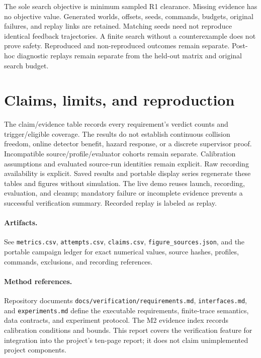 \documentclass[10pt]{article}
\begin{document}
The sole search objective is minimum sampled R1 clearance. Missing evidence has no objective value.
Generated worlds, offsets, seeds, commands, budgets, original failures, and replay links are retained.
Matching seeds need not reproduce identical feedback trajectories. A finite search without a
counterexample does not prove safety. Reproduced and non-reproduced outcomes remain separate.
Post-hoc diagnostic replays remain separate from the held-out matrix and original search budget.
\section{Claims, limits, and reproduction}
The claim/evidence table records every requirement's verdict counts and trigger/eligible coverage.
The results do not establish continuous collision freedom, online detector benefit, hazard response,
or a discrete supervisor proof. Incompatible source/profile/evaluator cohorts remain separate.
Calibration assumptions and evaluated source-run identities remain explicit. Raw recording availability is explicit.
Saved results and portable display series regenerate these tables and figures without simulation.
The live demo reuses launch, recording, evaluation, and cleanup; mandatory failure or incomplete
evidence prevents a successful verification summary. Recorded replay is labeled as replay.
\paragraph{Artifacts.} See \texttt{metrics.csv}, \texttt{attempts.csv}, \texttt{claims.csv},
\texttt{figure\_sources.json}, and the portable campaign ledger for exact numerical values,
source hashes, profiles, commands, exclusions, and recording references.
\paragraph{Method references.} Repository documents \texttt{docs/verification/requirements.md},
\texttt{interfaces.md}, and \texttt{experiments.md} define the executable requirements,
finite-trace semantics, data contracts, and experiment protocol. The M2 evidence index records
calibration conditions and bounds. This report covers the verification feature for integration
into the project's ten-page report; it does not claim unimplemented project components.
\end{document}

